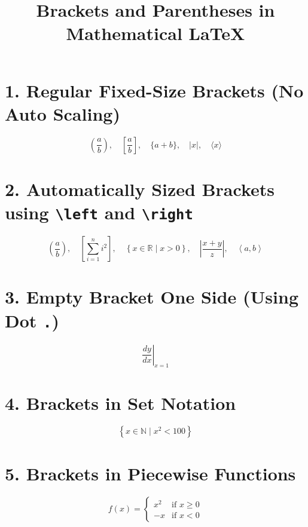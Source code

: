 \documentclass{article}
\title{Brackets and Parentheses in Mathematical LaTeX}
\date{}
\begin{document}
\maketitle

\section*{1. Regular Fixed-Size Brackets (No Auto Scaling)}

\[
(\frac{a}{b} ), \quad [ \frac{a}{b} ], \quad \{ a + b \}, \quad |x|, \quad \langle x \rangle
\]

\section*{2. Automatically Sized Brackets using \texttt{\textbackslash left} and \texttt{\textbackslash right}}

\[
\left( \frac{a}{b} \right), \quad
\left[ \sum_{i=1}^{n} i^2 \right], \quad
\left\{ x \in \mathbb{R} \mid x > 0 \right\}, \quad
\left| \frac{x+y}{z} \right|, \quad
\left\langle a, b \right\rangle
\]

\section*{3. Empty Bracket One Side (Using Dot \texttt{.})}

\[
\left. \frac{dy}{dx} \right|_{x = 1}
\]

\section*{4. Brackets in Set Notation}

\[
\left\{ x \in \mathbb{N} \mid x^2 < 100 \right\}
\]

\section*{5. Brackets in Piecewise Functions}

\[
f(x) =
\begin{cases}
x^2 & \text{if } x \ge 0 \\
-x  & \text{if } x < 0
\end{cases}
\]
\end{document}
